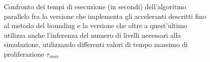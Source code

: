 \begin{figure}[h]
    \centering
    \caption{Confronto dei tempi di esecuzione (in secondi) dell'algoritmo
    parallelo fra la versione che implementa gli acceleranti descritti fino al
    metodo del bounding
    e la versione che oltre a quest'ultimo utilizza anche l'inferenza del numero
    di livelli necessari alla simulazione,
    utilizzando differenti valori di tempo massimo di proliferazione
    $\tau_{max}$}
    \label{chart:bounding-inference}
\end{figure}

